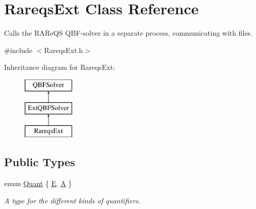 \hypertarget{classRareqsExt}{\section{Rareqs\-Ext Class Reference}
\label{classRareqsExt}
}


Calls the R\-A\-Re\-Q\-S Q\-B\-F-\/solver in a separate process, communicating with files.  




{\ttfamily \#include $<$Rareqs\-Ext.\-h$>$}

Inheritance diagram for Rareqs\-Ext\-:\begin{figure}[H]
\begin{center}
\leavevmode
\includegraphics[height=3.000000cm]{classRareqsExt}
\end{center}
\end{figure}
\subsection*{Public Types}
\begin{DoxyCompactItemize}
\item 
enum \hyperlink{classQBFSolver_ac091e263cb55286cc07b2451bcf4d3c7}{Quant} \{ \hyperlink{classQBFSolver_ac091e263cb55286cc07b2451bcf4d3c7a090ab4a5b262710ccd80e97d72f9a7b3}{E}, 
\hyperlink{classQBFSolver_ac091e263cb55286cc07b2451bcf4d3c7afd6518d5d985aa8346ac071e4c0d8ee0}{A}
 \}
\begin{DoxyCompactList}\small\item\em A type for the different kinds of quantifiers. \end{DoxyCompactList}\end{DoxyCompactItemize}
